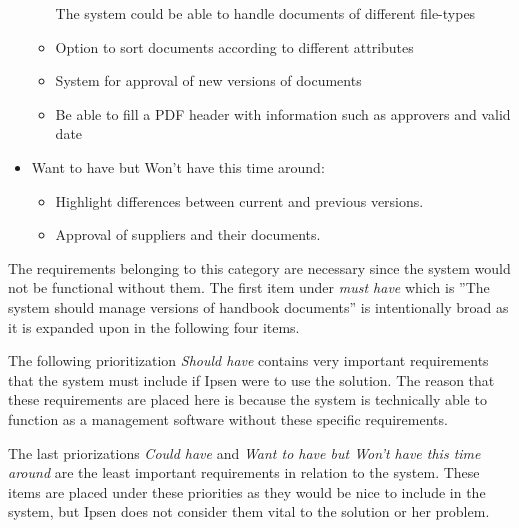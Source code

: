\begin{itemize}
\begin{itemize}
            The system could be able to handle documents of different file-types
            \item
            Option to sort documents according to different attributes
            \item
            System for approval of new versions of documents
			\item
			Be able to fill a PDF header with information such as approvers and valid date
        \end{itemize}
    \item
    Want to have but Won't have this time around:
        \begin{itemize}
            \item
            Highlight differences between current and previous versions.
            \item
            Approval of suppliers and their documents.
        \end{itemize}
\end{itemize}

The requirements belonging to this category are necessary since the system would not be functional without them.
The first item under \textit{must have} which is ''The system should manage versions of handbook documents'' is intentionally broad as it is expanded upon in the following four items.

The following prioritization \textit{Should have} contains very important requirements that the system must include if Ipsen were to use the solution.
The reason that these requirements are placed here is because the system is technically able to function as a management software without these specific requirements.

The last priorizations \textit{Could have} and \textit{Want to have but Won't have this time around} are the least important requirements in relation to the system.
These items are placed under these priorities as they would be nice to include in the system, but Ipsen does not consider them vital to the solution or her problem.
